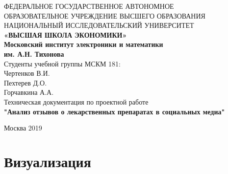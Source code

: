 \documentclass[a4paper,12pt]{article}
\begin{document}
	
\begin{center} 
	\hfill \break 
	\normalsize{ФЕДЕРАЛЬНОЕ ГОСУДАРСТВЕННОЕ АВТОНОМНОЕ }\\ 
	\normalsize{ОБРАЗОВАТЕЛЬНОЕ УЧРЕЖДЕНИЕ ВЫСШЕГО ОБРАЗОВАНИЯ }\\ 
	\normalsize{НАЦИОНАЛЬНЫЙ ИССЛЕДОВАТЕЛЬСКИЙ УНИВЕРСИТЕТ}\\ 
	\normalsize{\textbf{«ВЫСШАЯ ШКОЛА ЭКОНОМИКИ»}}\\ 
	\hfill \break 
	\normalsize{\textbf{Московский институт электроники и математики\\ им. А.Н. Тихонова}}\\ 
	\hfill \break 
	\normalsize{Студенты учебной группы МСКМ 181:\\Чертенков В.И.\\Пехтерев Д.О.\\Горчавкина А.А.\\} 
	\hfill \break 
	\hfill \break 
	\hfill \break 
	\large{Техническая документация по проектной работе\\ \textbf{"Анализ отзывов о лекарственных препаратах в социальных медиа"}}\\ 
	\hfill \break 
	\hfill \break 
	\hfill \break 
	\hfill \break 
	\hfill \break 
	\hfill \break 
\end{center} 
\hfill \break 
\begin{flushright} 
	\hfill \break 
	\hfill \break 
	\normalsize{Руководитель проекта \\ 
		\hfill \break 
		\normalsize{Артамонов С.Ю.} 
	\end{flushright} 
	\hfill \break 
	\begin{center} Москва 2019 \end{center} 
	\thispagestyle{empty} 
	
\section{Визуализация}
\end{document}
